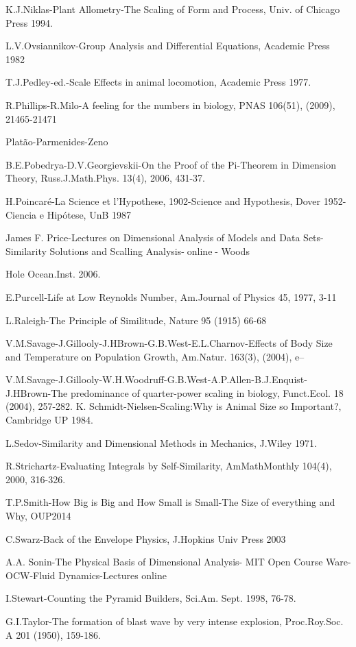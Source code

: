 K.J.Niklas-Plant Allometry-The Scaling of Form and Process, Univ. of Chicago Press 1994.

L.V.Ovsiannikov-Group Analysis and Differential Equations, Academic Press 1982

T.J.Pedley-ed.-Scale Effects in animal locomotion, Academic Press 1977.

R.Phillips-R.Milo-A feeling for the numbers in biology, PNAS 106(51), (2009), 21465-21471

Platão-Parmenides-Zeno

B.E.Pobedrya-D.V.Georgievskii-On the Proof of the Pi-Theorem in Dimension Theory, Russ.J.Math.Phys. 13(4), 2006, 431-37.

H.Poincaré-La Science et l’Hypothese, 1902-Science and Hypothesis, Dover 1952- Ciencia e Hipótese, UnB 1987

James F. Price-Lectures on Dimensional Analysis of Models and Data Sets-Similarity Solutions and Scalling Analysis-online- Woods

Hole Ocean.Inst. 2006.

E.Purcell-Life at Low Reynolds Number, Am.Journal of Physics 45, 1977, 3-11

L.Raleigh-The Principle of Similitude, Nature 95 (1915) 66-68

V.M.Savage-J.Gillooly-J.HBrown-G.B.West-E.L.Charnov-Effects of Body Size and Temperature on Population Growth, Am.Natur. 163(3), (2004), e–

V.M.Savage-J.Gillooly-W.H.Woodruff-G.B.West-A.P.Allen-B.J.Enquist-J.HBrown-The predominance of quarter-power scaling in biology, Funct.Ecol. 18 (2004), 257-282.
K. Schmidt-Nielsen-Scaling:Why is Animal Size so Important?, Cambridge UP 1984.

L.Sedov-Similarity and Dimensional Methods in Mechanics, J.Wiley 1971.

R.Strichartz-Evaluating Integrals by Self-Similarity, AmMathMonthly 104(4), 2000, 316-326.

T.P.Smith-How Big is Big and How Small is Small-The Size of everything and Why, OUP2014

C.Swarz-Back of the Envelope Physics, J.Hopkins Univ Press 2003

A.A. Sonin-The Physical Basis of Dimensional Analysis- MIT Open Course Ware-OCW-Fluid Dynamics-Lectures online

I.Stewart-Counting the Pyramid Builders, Sci.Am. Sept. 1998, 76-78.

G.I.Taylor-The formation of blast wave by very intense explosion, Proc.Roy.Soc. A 201 (1950), 159-186.

